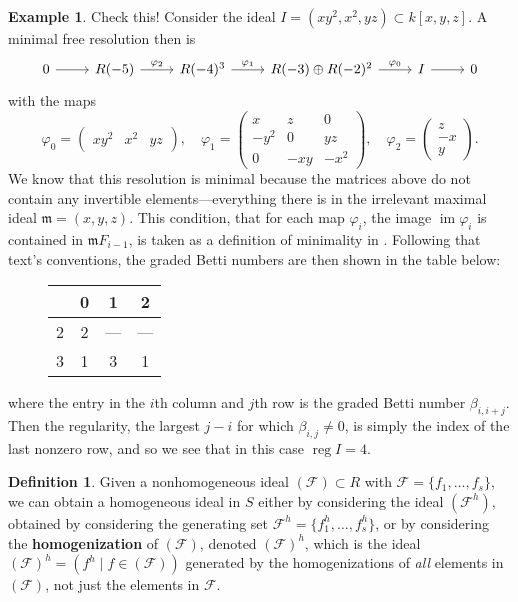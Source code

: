 \documentclass[11pt]{article}
\newcommand{\F}{\mathcal{F}}
\DeclareMathOperator{\reg}{reg}
\DeclareMathOperator{\im}{im}
\theoremstyle{definition}
\newtheorem{definition}{Definition}
\newtheorem{example}{Example}
\begin{document}
\begin{example}
	\color{red} Check this! \color{black} Consider the ideal $I = (xy^2, x^2, yz) \subset k[x,y,z]$. A minimal free resolution then is \[ \begin{tikzcd}
		0 \arrow[r] & R(-5) \arrow[r, "\varphi_2"] & R(-4)^3 \arrow[r, "\varphi_1"] & R(-3) \oplus R(-2)^2 \arrow[r, "\varphi_0"] & I \arrow[r] & 0
	\end{tikzcd} \] with the maps \[ \varphi_0 = \begin{pmatrix}
		xy^2 & x^2 & yz
	\end{pmatrix}, \quad \varphi_1 = \begin{pmatrix}
		x & z & 0 \\
		-y^2 & 0 & yz \\
		0 & -xy & -x^2
	\end{pmatrix}, \quad \varphi_2 = \begin{pmatrix}
		z \\
		-x \\
		y
	\end{pmatrix}. \] We know that this resolution is minimal because the matrices above do not contain any invertible elements---everything there is in the irrelevant maximal ideal $\mathfrak{m} = (x,y,z)$. This condition, that for each map $\varphi_i$, the image $\im \varphi_i$ is contained in $\mathfrak{m} F_{i-1}$, is taken as a definition of minimality in \cite{eisenbud2005geometry}. Following that text's conventions, the graded Betti numbers are then shown in the table below: \begin{figure}[H]
		\centering
		\begin{tabular}{c|ccc}
			& 0 & 1 & 2 \\
			\hline
			2 & 2 & --- & --- \\
			3 & 1 & 3 & 1
		\end{tabular}
	\end{figure} \noindent where the entry in the $i$th column and $j$th row is the graded Betti number $\beta_{i,i + j}$. Then the regularity, the largest $j - i$ for which $\beta_{i,j} \neq 0$, is simply the index of the last nonzero row, and so we see that in this case $\reg I = 4$. 
\end{example} 


\begin{definition}
	Given a nonhomogeneous ideal $(\F) \subset R$ with $\F = \{f_1, \dots, f_s\}$, we can obtain a homogeneous ideal in $S$ either by considering the ideal $(\F^h)$, obtained by considering the generating set $\F^h = \{f_1^h, \dots, f_s^h\}$, or by considering the \textbf{homogenization} of $(\F)$, denoted $(\F)^h$, which is the ideal $(\F)^h = (f^h \mid f \in (\F))$ generated by the homogenizations of \emph{all} elements in $(\F)$, not just the elements in $\F$. 
\end{definition}
\end{document}
